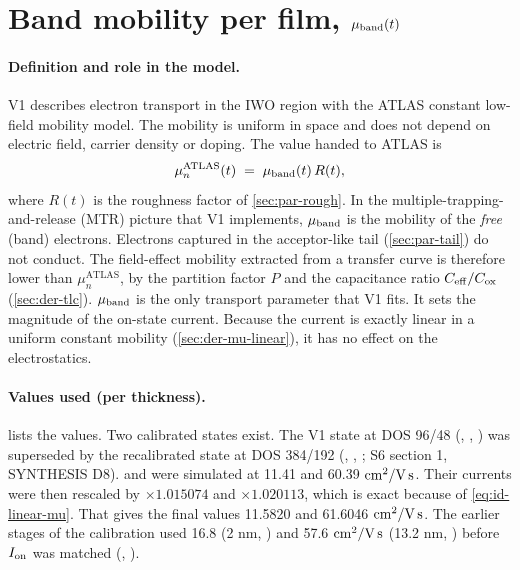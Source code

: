 \section{Band mobility per film, \texorpdfstring{$\mu_{\mathrm{band}}(t)$}{mu\_band(t)}}\label{sec:par-mu}

\paragraph{Definition and role in the model.}
V1 describes electron transport in the IWO region with the ATLAS constant low-field mobility model. The mobility is uniform in space and does not depend on electric field, carrier density or doping. The value handed to ATLAS is
\begin{equation}
  \mu_n^{\mathrm{ATLAS}}(t) \;=\; \mu_{\mathrm{band}}(t)\, R(t),
  \label{eq:d2-mun}
\end{equation}
where $R(t)$ is the roughness factor of \cref{sec:par-rough}. In the multiple-trapping-and-release (MTR) picture that V1 implements, $\mu_{\mathrm{band}}$ is the mobility of the \emph{free} (band) electrons. Electrons captured in the acceptor-like tail (\cref{sec:par-tail}) do not conduct. The field-effect mobility extracted from a transfer curve is therefore lower than $\mu_n^{\mathrm{ATLAS}}$, by the partition factor $P$ and the capacitance ratio $C_{\mathrm{eff}}/C_{\mathrm{ox}}$ (\cref{sec:der-tlc}). $\mu_{\mathrm{band}}$ is the only transport parameter that V1 fits. It sets the magnitude of the on-state current. Because the current is exactly linear in a uniform constant mobility (\cref{sec:der-mu-linear}), it has no effect on the electrostatics.

\paragraph{Values used (per thickness).}
 lists the values. Two calibrated states exist. The V1 state at DOS 96/48 (, , ) was superseded by the recalibrated state at DOS 384/192 (, , ; S6 section 1, SYNTHESIS D8).  and  were simulated at 11.41 and 60.39\,$\,\mathrm{cm}^{2}/\mathrm{V\,s}$. Their currents were then rescaled by $\times 1.015074$ and $\times 1.020113$, which is exact because of \cref{eq:id-linear-mu}. That gives the final values 11.5820 and 61.6046\,$\,\mathrm{cm}^{2}/\mathrm{V\,s}$. The earlier stages of the calibration used 16.8 (2 nm, ) and 57.6\,$\,\mathrm{cm}^{2}/\mathrm{V\,s}$ (13.2 nm, ) before $I_{\mathrm{on}}$ was matched (, ).

